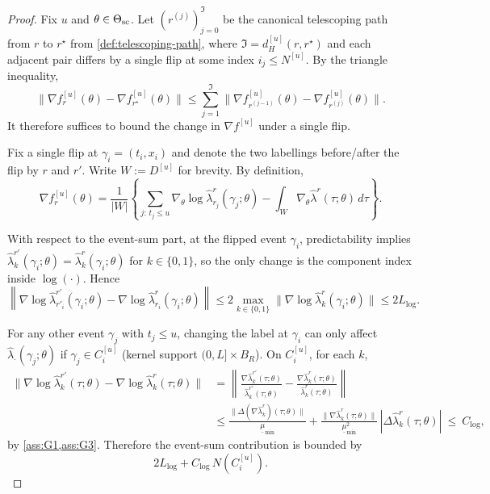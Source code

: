 \documentclass{statsoc}
\newcommand{\1}{\mathbbm{1}}
\begin{document}
\begin{proof}
Fix $u$ and $\theta\in\Theta_{\rm sc}$. Let $(r^{(j)})_{j=0}^{\mathfrak I}$ be the canonical telescoping path from $r$ to
$r^\star$ from \cref{def:telescoping-path}, where $\mathfrak I=d_H^{[u]}(r,r^\star)$ and each adjacent pair
differs by a single flip at some index $i_j\le N^{[u]}$. By the triangle inequality,
\[
\big\|\nabla f_r^{[u]}(\theta)-\nabla f_{r^\star}^{[u]}(\theta)\big\|
\le
\sum_{j=1}^{\mathfrak I}
\big\|\nabla f_{r^{(j-1)}}^{[u]}(\theta)-\nabla f_{r^{(j)}}^{[u]}(\theta)\big\|.
\]
It therefore suffices to bound the change in $\nabla f^{[u]}$ under a single flip.

Fix a single flip at $\gamma_{i}=(t_{i},x_{i})$ and denote the two labellings before/after the flip by $r$ and $r'$.
Write $W:=D^{[u]}$ for brevity. By definition,
\[
\nabla f_r^{[u]}(\theta)
=\frac{1}{|W|}\left\{\sum_{j:\,t_j\le u}\nabla_\theta\log\widehat\lambda_{r_j}^r(\gamma_j;\theta)
-\int_W \nabla_\theta \widehat\lambda^r(\tau;\theta)\,d\tau\right\}.
\]


With respect to the event-sum part, at the flipped event $\gamma_i$, predictability implies
$\widehat\lambda_k^{r'}(\gamma_i;\theta)=\widehat\lambda_k^{r}(\gamma_i;\theta)$ for $k\in\{0,1\}$, so the only change
is the component index inside $\log(\cdot)$. Hence
\[
\left\|\nabla\log\widehat\lambda_{r'_{i}}^{r'}(\gamma_i;\theta)
-\nabla\log\widehat\lambda_{r_{i}}^{r}(\gamma_i;\theta)\right\|
\le 2\max_{k\in\{0,1\}}\|\nabla\log\widehat\lambda_k^{r}(\gamma_i;\theta)\|
\le 2L_{\log}.
\]

For any other event $\gamma_j$ with $t_j\le u$, changing the label at $\gamma_{i}$ can only affect
$\widehat\lambda_\cdot(\gamma_j;\theta)$ if $\gamma_j\in C_{i}^{[u]}$ (kernel support $(0,L]\times B_R$).
On $C_{i}^{[u]}$, for each $k$,
\begin{align*}
\big\|\nabla\log\widehat\lambda_k^{r'}(\tau;\theta)-\nabla\log\widehat\lambda_k^{r}(\tau;\theta)\big\|
&=
\left\|\frac{\nabla\widehat\lambda_k^{r'}(\tau;\theta)}{\widehat\lambda_k^{r'}(\tau;\theta)}
-\frac{\nabla\widehat\lambda_k^{r}(\tau;\theta)}{\widehat\lambda_k^{r}(\tau;\theta)}\right\|\\
&\le
\frac{\|\Delta(\nabla \widehat\lambda_k^r)(\tau;\theta)\|}{\underline\mu_{\min}}
+\frac{\|\nabla \widehat\lambda_k^{r}(\tau;\theta)\|}{\underline\mu_{\min}^2}\,|\Delta\widehat\lambda_k^r(\tau;\theta)|
\ \le\ C_{\log},
\end{align*}
by \cref{ass:G1,ass:G3}. Therefore the event-sum contribution is bounded by
\[
2L_{\log}+C_{\log}\,N(C_{i}^{[u]}).
\]


\end{proof}
\end{document}
